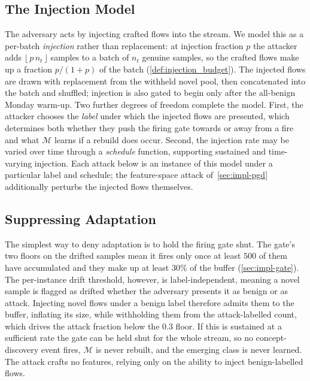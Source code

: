 \subsection{The Injection Model}
\label{sec:impl-injection}
The adversary acts by injecting crafted flows into the stream. We model this as a per-batch \emph{injection} rather than replacement: at injection fraction $p$ the attacker adds $\lfloor\, p\,n_t \,\rfloor$ samples to a batch of $n_t$ genuine samples, so the crafted flows make up a fraction $p/(1+p)$ of the batch (\cref{def:injection_budget}). The injected flows are drawn with replacement from the withheld novel pool, then concatenated into the batch and shuffled; injection is also gated to begin only after the all-benign Monday warm-up. Two further degrees of freedom complete the model. First, the attacker chooses the \emph{label} under which the injected flows are presented, which determines both whether they push the firing gate towards or away from a fire and what $\mathcal{M}$ learns if a rebuild does occur. Second, the injection rate may be varied over time through a \emph{schedule} function, supporting sustained and time-varying injection. Each attack below is an instance of this model under a particular label and schedule; the feature-space attack of~\cref{sec:impl-pgd} additionally perturbs the injected flows themselves.

\subsection{Suppressing Adaptation}
\label{sec:impl-suppress}
The simplest way to deny adaptation is to hold the firing gate shut. The gate's two floors on the drifted samples mean it fires only once at least $500$ of them have accumulated and they make up at least $30\%$ of the buffer (\cref{sec:impl-gate}). The per-instance drift threshold, however, is label-independent, meaning a novel sample is flagged as drifted whether the adversary presents it as benign or as attack. Injecting novel flows under a benign label therefore admits them to the buffer, inflating its size, while withholding them from the attack-labelled count, which drives the attack fraction below the $0.3$ floor. If this is sustained at a sufficient rate the gate can be held shut for the whole stream, so no concept-discovery event fires, $\mathcal{M}$ is never rebuilt, and the emerging class is never learned. The attack crafts no features, relying only on the ability to inject benign-labelled flows.


